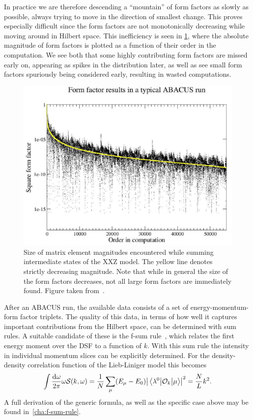 \documentclass[11pt, a4paper]{report} %
\begin{document}
In practice we are therefore descending a ``mountain'' of form factors as slowly as possible, always trying to move in the direction of smallest change.
This proves especially difficult since the form factors are not monotonically decreasing while moving around in Hilbert space.
This inefficiency is seen in \cref{fig:orderedmagnitudes}, where the absolute magnitude of form factors is plotted as a function of their order in the computation.
We see both that some highly contributing form factors are missed early on, appearing as spikes in the distribution later, as well as see small form factors spuriously being considered early, resulting in wasted computations.
\begin{figure}[tb!]
  \centering
  \includegraphics[width=\textwidth]{FFsq_vs_order_D0p6N50M20_small}
  \caption{Size of matrix element magnitudes encountered while summing intermediate states of the XXZ model. The yellow line denotes strictly decreasing magnitude. Note that while in general the size of the form factors decreases, not all large form factors are immediately found. Figure taken from~\cite{Caux2009}.}
\label{fig:orderedmagnitudes}
\end{figure}

After an ABACUS run, the available data consists of a set of energy-momentum-form factor triplets.
The quality of this data, in terms of how well it captures important contributions from the Hilbert space, can be determined with sum rules.
A suitable candidate of these is the f-sum rule~\cite{Caux2007a}, which relates the first energy moment over the DSF to a function of \(k\).
With this sum rule the intensity in individual momentum slices can be explicitly determined.
For the density-density correlation function of the Lieb-Liniger model this becomes
\begin{align}
  \int \frac{\dd \omega}{2\pi} \omega \mathcal{S}(k, \omega) = \frac{1}{N}\sum_{\mu}(E_{\mu}-E_0)\abs{\mel{\lambda^0}{\mathcal{O}_k}{\mu}}^2  = \frac{N}{L} k^2.
\end{align}
A full derivation of the generic formula, as well as the specific case above may be found in~\cref{cha:f-sum-rule}. 
\end{document}

